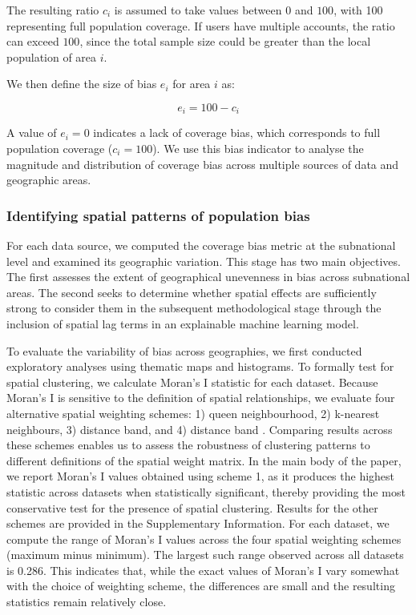 \documentclass[]{rsos}%
\begin{document}
The resulting ratio \(c_i\) is assumed to take values
between \(0\) and \(100\), with 100 representing full population coverage.
If users have multiple accounts, the ratio can exceed \(100\), since the
total sample size could be greater than the local population of area
\(i\).

We then define the size of bias \(e_i\) for area \(i\) as:

\begin{equation} \label{eq:size-bias}
e_i = 100 - c_i
\end{equation}

A value of \(e_i = 0\) indicates a lack of coverage bias, which
corresponds to full population coverage (\(c_i = 100\)). We use this bias
indicator to analyse the magnitude and distribution of coverage bias
across multiple sources of data and geographic areas.

\subsubsection{Identifying spatial patterns of population bias}\label{identifying-spatial-patterns-of-population-bias}

For each data source, we computed the coverage bias metric at the
subnational level and examined its geographic variation. This stage has
two main objectives. The first assesses the extent of geographical unevenness in bias
across subnational areas. The second seeks to determine whether spatial effects are
sufficiently strong to consider them in the subsequent methodological
stage through the inclusion of spatial lag terms in an explainable
machine learning model.

To evaluate the variability of bias across geographies, we first
conducted exploratory analyses using thematic maps and histograms. To
formally test for spatial clustering, we calculate Moran's I statistic
for each dataset. Because Moran's I is sensitive to the definition of
spatial relationships, we evaluate four alternative spatial weighting
schemes: 1) queen neighbourhood, 2) k-nearest neighbours, 3) distance
band, and 4) distance band \citep{rey2023}.
Comparing results across these schemes enables us to assess the
robustness of clustering patterns to different definitions of the
spatial weight matrix. In the main body of the paper, we report Moran's
I values obtained using scheme 1, as it produces the highest statistic
across datasets when statistically significant, thereby providing the
most conservative test for the presence of spatial clustering. Results
for the other schemes are provided in the Supplementary Information. For
each dataset, we compute the range of Moran's I values across the four
spatial weighting schemes (maximum minus minimum). The largest such
range observed across all datasets is 0.286. This indicates that, while
the exact values of Moran's I vary somewhat with the choice of weighting
scheme, the differences are small and the resulting statistics remain
relatively close.
\end{document}
